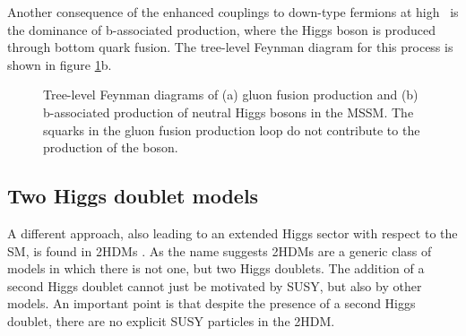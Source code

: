 Another consequence of the enhanced couplings to down-type fermions at high \tanb~is the dominance of b-associated production, where the Higgs boson is produced through
bottom quark fusion. The tree-level Feynman diagram for this process is shown in figure \ref{fig:production_mssm}b.

\begin{figure}[h!]
\begin{center}
\end{center}
\caption[Tree-level Feynman diagrams of gluon fusion and b-associated production of neutral Higgs bosons in the MSSM.]{Tree-level Feynman diagrams of (a) gluon fusion production and (b) b-associated
production of neutral Higgs bosons in the MSSM. The squarks in the gluon fusion production loop do not contribute to the production of the \PHiggsps boson.}
\label{fig:production_mssm}
\end{figure}

\subsection{Two Higgs doublet models}
\label{sec:theory_2HDM}
A different approach, also leading to an extended Higgs sector with
respect to the \ac{SM}, is found in \acp{2HDM} \cite{2HDM-I,2HDM-II}.
As the name suggests \acp{2HDM} are a generic class of models in which
there is not one, but two Higgs doublets. The addition of a second
Higgs doublet cannot just be motivated by \ac{SUSY}, but also by other models.
An important point is that despite the presence of a second 
Higgs doublet, there are no explicit \ac{SUSY} particles in the \ac{2HDM}.

